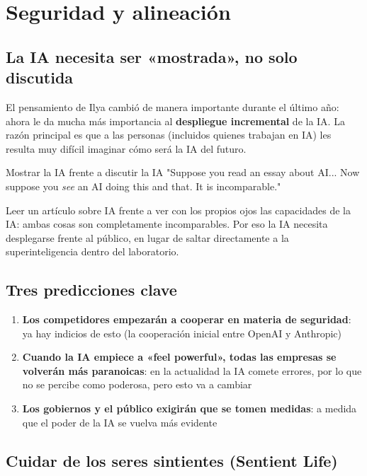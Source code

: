 \section{Seguridad y alineación}

\subsection{La IA necesita ser «mostrada», no solo discutida}

El pensamiento de Ilya cambió de manera importante durante el último año: ahora le da mucha más importancia al \textbf{despliegue incremental} de la IA. La razón principal es que a las personas (incluidos quienes trabajan en IA) les resulta muy difícil imaginar cómo será la IA del futuro.

\begin{importantbox}{Mostrar la IA frente a discutir la IA}
"Suppose you read an essay about AI... Now suppose you \textit{see} an AI doing this and that. It is incomparable."

Leer un artículo sobre IA frente a ver con los propios ojos las capacidades de la IA: ambas cosas son completamente incomparables. Por eso la IA necesita desplegarse frente al público, en lugar de saltar directamente a la superinteligencia dentro del laboratorio.
\end{importantbox}

\subsection{Tres predicciones clave}

\begin{enumerate}
    \item \textbf{Los competidores empezarán a cooperar en materia de seguridad}: ya hay indicios de esto (la cooperación inicial entre OpenAI y Anthropic)
    \item \textbf{Cuando la IA empiece a «feel powerful», todas las empresas se volverán más paranoicas}: en la actualidad la IA comete errores, por lo que no se percibe como poderosa, pero esto va a cambiar
    \item \textbf{Los gobiernos y el público exigirán que se tomen medidas}: a medida que el poder de la IA se vuelva más evidente
\end{enumerate}

\subsection{Cuidar de los seres sintientes (Sentient Life)}

